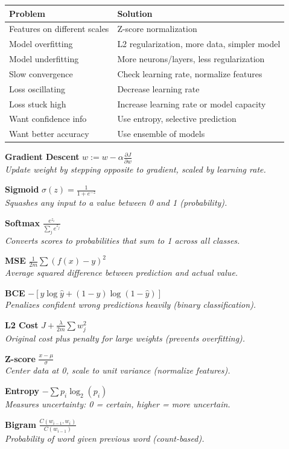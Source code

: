 \documentclass[11pt,a4paper]{article}
\begin{document}
\begin{definitionbox}

\begin{tabular}{@{}l|l@{}}
\textbf{Problem} & \textbf{Solution} \\
\hline
Features on different scales & Z-score normalization \\
Model overfitting & L2 regularization, more data, simpler model \\
Model underfitting & More neurons/layers, less regularization \\
Slow convergence & Check learning rate, normalize features \\
Loss oscillating & Decrease learning rate \\
Loss stuck high & Increase learning rate or model capacity \\
Want confidence info & Use entropy, selective prediction \\
Want better accuracy & Use ensemble of models \\
\end{tabular}
\end{definitionbox}

\begin{definitionbox}

\textbf{Gradient Descent} \hfill $w := w - \alpha \frac{\partial J}{\partial w}$ \\
\textit{Update weight by stepping opposite to gradient, scaled by learning rate.}

\textbf{Sigmoid} \hfill $\sigma(z) = \frac{1}{1 + e^{-z}}$ \\
\textit{Squashes any input to a value between 0 and 1 (probability).}

\textbf{Softmax} \hfill $\frac{e^{z_i}}{\sum_j e^{z_j}}$ \\
\textit{Converts scores to probabilities that sum to 1 across all classes.}

\textbf{MSE} \hfill $\frac{1}{2m}\sum(f(x) - y)^2$ \\
\textit{Average squared difference between prediction and actual value.}

\textbf{BCE} \hfill $-[y\log\hat{y} + (1-y)\log(1-\hat{y})]$ \\
\textit{Penalizes confident wrong predictions heavily (binary classification).}

\textbf{L2 Cost} \hfill $J + \frac{\lambda}{2m}\sum w_j^2$ \\
\textit{Original cost plus penalty for large weights (prevents overfitting).}

\textbf{Z-score} \hfill $\frac{x - \mu}{\sigma}$ \\
\textit{Center data at 0, scale to unit variance (normalize features).}

\textbf{Entropy} \hfill $-\sum p_i \log_2(p_i)$ \\
\textit{Measures uncertainty: 0 = certain, higher = more uncertain.}

\textbf{Bigram} \hfill $\frac{C(w_{i-1}, w_i)}{C(w_{i-1})}$ \\
\textit{Probability of word given previous word (count-based).}
\end{definitionbox}
\end{document}
